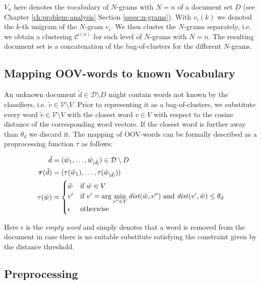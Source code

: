 $V_n$ here denotes the vocabulary of $N$-grams with $N=n$ of a document set
$D$ (see Chapter \ref{ch:problem-analysis} Section \ref{sssec:n-grams}). With
$v_i(k)$ we denoted the $k$-th unigram of the $N$-gram $v_i$.
We then cluster the $N$-grams separately, i.e. we obtain a clustering
$\mathcal{C}^{(n)}$ for each level of $N$-grams with $N=n$. The resulting
document set is a concatenation of the bag-of-clusters for the different $N$-grams.

\subsection{Mapping OOV-words to known Vocabulary}

An unknown document $\tilde{d} \in \mathcal{D}\setminus D$ might contain words not
known by the classifiers, i.e. $\tilde{v} \in \mathcal{V}\setminus V$. Prior to
representing it as a bag-of-clusters, we substitute every word $\tilde{v} \in
\mathcal{V} \setminus V$ with the closest word $v \in V$ with respect to the
cosine distance of the corresponding word vectors. If the closest word is
further away than $\theta_d$ we discard it. The mapping of OOV-words can be
formally described as a proprocessing function $\tau$ as follows:

\begin{equation*}
\begin{split}
	\tilde{d} &= (\tilde{w}_1, \ldots, \tilde{w}_{|\tilde{d}|}) \in
	\mathcal{D}\setminus D \\	
	\boldsymbol\tau(\tilde{d}) &= (\tau(\tilde{w}_1), \ldots,
	\tau(\tilde{w}_{|\tilde{d}|})) \\	
	\tau(\tilde{w}) &= \begin{cases} \tilde{w} & \text{if~} \tilde{w} \in V \\ v' &
	\text{if~} v' = \arg\min\limits_{v''\in V}\mathit{dist}(\tilde{w},v'') 
	\text{~and~} \mathit{dist}(v',\tilde{w}) \leq \theta_d \\ \epsilon
	& \text{otherwise}
	\end{cases}	
\end{split} 
\end{equation*}

Here $\epsilon$ is the \emph{empty word} and simply denotes that a word is removed
from the document in case there is no suitable substitute satisfying the
constraint given by the distance threshold.

\subsection{Preprocessing}

